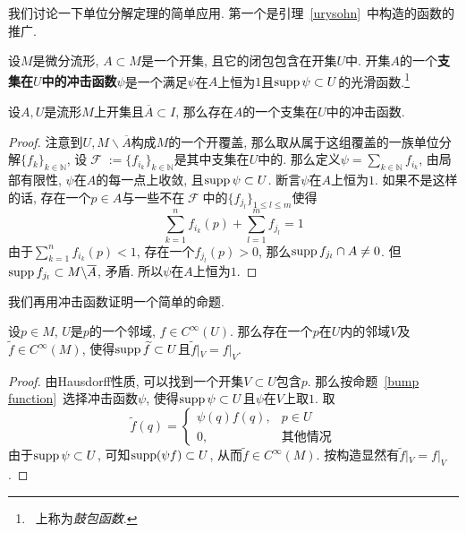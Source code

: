 我们讨论一下单位分解定理的简单应用.
第一个是引理~\ref{urysohn}~中构造的函数的推广.
\begin{defn}
    设$M$是微分流形, $A\subset M$是一个开集, 且它的闭包包含在开集$U$中.
    开集$A$的一个\textbf{支集在$U$中的冲击函数}$\psi$是一个满足$\psi$在$A$上恒为$1$且$\operatorname{supp}\psi\subset U$的光滑函数.\footnote{\parencite{Mei_Manifold}~上称为\textit{鼓包函数}.}
\end{defn}

\begin{prop}\label{bump function}
    设$A, U$是流形$M$上开集且$\overline{A}\subset I$, 那么存在$A$的一个支集在$U$中的冲击函数.
\end{prop}
\begin{proof}
    注意到$U,M\backslash\overline{A}$构成$M$的一个开覆盖, 那么取从属于这组覆盖的一族单位分解$\{f_k\}_{k\in\mathbb{N}}$,
    设$\mscrF:=\{f_{i_k}\}_{k\in\mathbb{N}}$是其中支集在$U$中的.
    那么定义$\displaystyle\psi=\sum_{k\in\mathbb{N}}f_{i_k}$, 由局部有限性, $\psi$在$A$的每一点上收敛, 且$\operatorname{supp}\psi\subset U$.
    断言$\psi$在$A$上恒为$1$.
    如果不是这样的话, 存在一个$p\in A$与一些不在$\mscrF$中的$\{f_{j_l}\}_{1\leq l \leq m}$使得
    \[\sum_{k=1}^nf_{i_k}(p)+\sum_{l=1}^mf_{j_l}=1\]
    由于$\displaystyle\sum_{k=1}^nf_{i_k}(p)<1$, 存在一个$f_{j_l}(p)>0$, 那么$\operatorname{supp}{f_{j_l}}\cap A\neq 0$.
    但$\operatorname{supp}{f_{j_l}}\subset M\backslash\overline{A}$, 矛盾.
    所以$\psi$在$A$上恒为$1$.
\end{proof}

我们再用冲击函数证明一个简单的命题.
\begin{prop}[光滑函数扩张引理]\label{function extension}
    设$p\in M$, $U$是$p$的一个邻域, $f\in C^\infty(U)$.
    那么存在一个$p$在$U$内的邻域$V$及$\widetilde{f}\in C^\infty(M)$, 使得$\operatorname{supp}\widetilde{f}\subset U$且$\widetilde{f}|_V=f|_V$.
\end{prop}

\begin{proof}
    由Hausdorff性质, 可以找到一个开集$V\subset U$包含$p$.
    那么按命题~\ref{bump function}~选择冲击函数$\psi$, 使得$\operatorname{supp}\psi\subset U$且$\psi$在$V$上取$1$.
    取
    \[\widetilde{f}(q)=\begin{cases}
        \psi(q)f(q), & p\in U\\
        0, & \text{其他情况}
    \end{cases}\]
    由于$\operatorname{supp}\psi\subset U$, 可知$\operatorname{supp}(\psi f)\subset U$, 从而$\widetilde{f}\in C^\infty(M)$.
    按构造显然有$\widetilde{f}|_V=f|_V$.
\end{proof}


